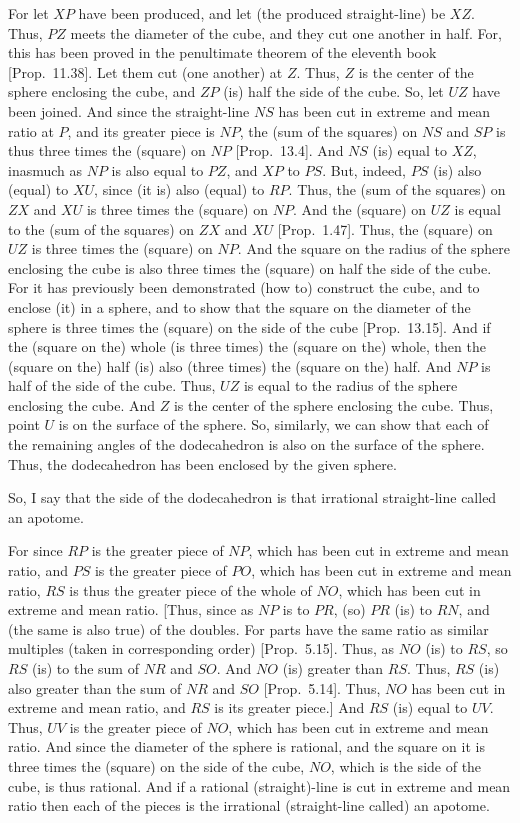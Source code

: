 \begin{Parallel}{}{}
{For let $XP$ have been produced, and let (the produced straight-line) be $XZ$. Thus, $PZ$ meets
the diameter of the cube, and they cut one another in half.
For, this has been proved in the penultimate theorem of the eleventh book [Prop.~11.38]. Let them cut (one another) at $Z$. Thus, $Z$ is the
center of the sphere enclosing the cube, and $ZP$ (is) half the side of
the cube. So, let $UZ$ have been joined. And since the straight-line 
$NS$ has been cut in extreme and mean ratio at $P$, and its greater piece
is $NP$, the (sum of the squares) on $NS$ and $SP$
is thus three times the (square) on $NP$ [Prop.~13.4]. And $NS$ (is)
equal to $XZ$, inasmuch as $NP$ is also equal to $PZ$, and
$XP$ to $PS$. But, indeed, $PS$ (is) also (equal) to $XU$,
since (it is) also (equal) to $RP$. Thus, the (sum of the squares) on 
$ZX$ and $XU$ is three times the (square) on $NP$.
And  the (square)
on $UZ$ is equal to the (sum of the squares) on $ZX$ and $XU$ [Prop.~1.47].  Thus, the (square) on $UZ$ is three times the
(square) on $NP$. 
 And the square on the
radius of the sphere enclosing the cube is also three times the (square) on half
the side of the cube. For it has previously been demonstrated (how to) construct 
the cube, and to enclose (it) in a sphere, and to show that the square on
the diameter of the sphere is three times the (square) on the
side of the cube [Prop.~13.15]. And if the (square on the) whole (is three
times) the (square on the) whole, then the (square on the) half (is) also (three times) the (square on the) half. 
And $NP$ is half of the side of the cube. Thus, $UZ$ is equal to
the radius of the sphere enclosing the cube. And $Z$ is the center of the
sphere enclosing the cube.
Thus, point $U$
is on the surface of the sphere. So, similarly, we can show that each of
the remaining angles of the dodecahedron is also  on the surface of the sphere. 
Thus, the dodecahedron has been enclosed by the given sphere.

So, I say that the side of the dodecahedron is that irrational straight-line
called an apotome.

For since  $RP$ is the greater piece of $NP$, which has been cut in extreme and mean ratio, and $PS$ is the greater piece of $PO$, which
has been cut in extreme and mean ratio,  $RS$ is thus the greater piece of the
whole of $NO$, which has been cut in extreme and mean ratio.
[Thus, since as $NP$ is to $PR$, (so) $PR$ (is) to $RN$, and  (the same is also true) of the doubles.
For parts have the same ratio as similar multiples (taken in corresponding
order) [Prop.~5.15]. Thus, as $NO$ (is) to $RS$, so $RS$
(is) to the sum of $NR$ and $SO$. And $NO$
(is) greater than $RS$. Thus, $RS$ (is) also
greater than the sum of $NR$ and $SO$ [Prop.~5.14]. Thus, $NO$
has been cut in extreme and mean ratio, and  $RS$ is its greater piece.]
And $RS$ (is) equal to $UV$. Thus, $UV$ is the greater piece of
$NO$, which has been cut in extreme and mean ratio. 
And since the diameter of the sphere is rational, and the square on it
is three times the (square) on the side of the cube,  $NO$, which is
the side of the cube, is thus rational. And if a rational (straight)-line
is cut in extreme and mean ratio then each of the
pieces is the irrational (straight-line called) an apotome.

}
\end{Parallel}
